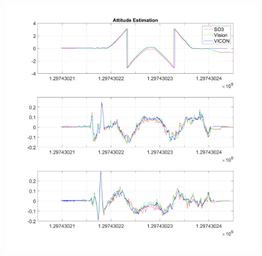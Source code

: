 \documentclass[a4paper]{article}
\begin{document}
\begin{figure}[!b]
\centering
\includegraphics[scale=0.3]{figures/so3_2.png}
\end{figure}
\end{document}
